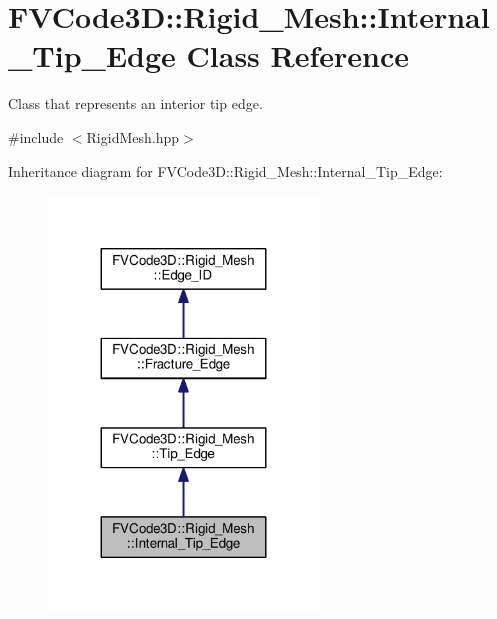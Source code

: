 \hypertarget{classFVCode3D_1_1Rigid__Mesh_1_1Internal__Tip__Edge}{}\section{F\+V\+Code3D\+:\+:Rigid\+\_\+\+Mesh\+:\+:Internal\+\_\+\+Tip\+\_\+\+Edge Class Reference}
\label{classFVCode3D_1_1Rigid__Mesh_1_1Internal__Tip__Edge}


Class that represents an interior tip edge.  




{\ttfamily \#include $<$Rigid\+Mesh.\+hpp$>$}



Inheritance diagram for F\+V\+Code3D\+:\+:Rigid\+\_\+\+Mesh\+:\+:Internal\+\_\+\+Tip\+\_\+\+Edge\+:
\nopagebreak
\begin{figure}[H]
\begin{center}
\leavevmode
\includegraphics[width=203pt]{classFVCode3D_1_1Rigid__Mesh_1_1Internal__Tip__Edge__inherit__graph}
\end{center}
\end{figure}



